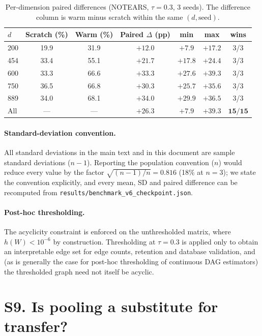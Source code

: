 \documentclass[11pt]{article}
\begin{document}
\setcounter{table}{7}
\begin{table}[h]
\small
\caption{Per-dimension paired differences (NOTEARS, $\tau=0.3$, 3 seeds). The
difference column is warm minus scratch within the same $(d,\text{seed})$.}
\begin{tabular}{@{}lcccccc@{}}
\toprule
$d$ & Scratch (\%) & Warm (\%) & Paired $\Delta$ (pp) & min & max & wins\\
\midrule
200 & 19.9 & 31.9 & $+12.0$ & $+7.9$ & $+17.2$ & 3/3\\
454 & 33.4 & 55.1 & $+21.7$ & $+17.8$ & $+24.4$ & 3/3\\
600 & 33.3 & 66.6 & $+33.3$ & $+27.6$ & $+39.3$ & 3/3\\
750 & 36.5 & 66.8 & $+30.3$ & $+25.7$ & $+35.6$ & 3/3\\
889 & 34.0 & 68.1 & $+34.0$ & $+29.9$ & $+36.5$ & 3/3\\
\midrule
All & --- & --- & $\mathbf{+26.3}$ & $+7.9$ & $+39.3$ & $\mathbf{15/15}$\\
\bottomrule
\end{tabular}
\label{tab:S8paired}
\end{table}

\paragraph{Standard-deviation convention.} All standard deviations in the main text and
in this document are sample standard deviations ($n-1$). Reporting the population
convention ($n$) would reduce every value by the factor
$\sqrt{(n-1)/n}=0.816$ (18\% at $n=3$); we state the convention explicitly, and every
mean, SD and paired difference can be recomputed from
\texttt{results/benchmark\_v6\_checkpoint.json}.

\paragraph{Post-hoc thresholding.} The acyclicity constraint is enforced on the
unthresholded matrix, where $h(W)<10^{-6}$ by construction. Thresholding at $\tau=0.3$
is applied only to obtain an interpretable edge set for edge counts, retention and
database validation, and (as is generally the case for post-hoc thresholding of
continuous DAG estimators) the thresholded graph need not itself be acyclic.


\section*{S9. Is pooling a substitute for transfer?}
\end{document}
